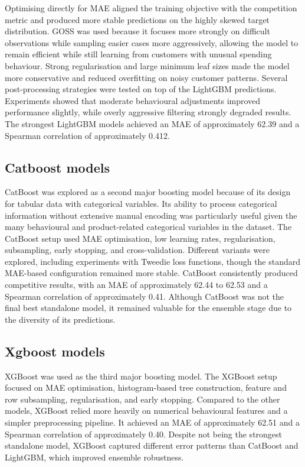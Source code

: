 Optimising directly for MAE aligned the training objective with the competition metric and produced more stable predictions on the highly skewed target distribution. GOSS was used because it focuses more strongly on difficult observations while sampling easier cases more aggressively, allowing the model to remain efficient while still learning from customers with unusual spending behaviour. Strong regularisation and large minimum leaf sizes made the model more conservative and reduced overfitting on noisy customer patterns. Several post-processing strategies were tested on top of the LightGBM predictions. Experiments showed that moderate behavioural adjustments improved performance slightly, while overly aggressive filtering strongly degraded results. The strongest LightGBM models achieved an MAE of approximately 62.39 and a Spearman correlation of approximately 0.412.

\subsection{Catboost models}
CatBoost was explored as a second major boosting model because of its design for tabular data with categorical variables. Its ability to process categorical information without extensive manual encoding was particularly useful given the many behavioural and product-related categorical variables in the dataset. The CatBoost setup used MAE optimisation, low learning rates, regularisation, subsampling, early stopping, and cross-validation. Different variants were explored, including experiments with Tweedie loss functions, though the standard MAE-based configuration remained more stable. CatBoost consistently produced competitive results, with an MAE of approximately 62.44 to 62.53 and a Spearman correlation of approximately 0.41. Although CatBoost was not the final best standalone model, it remained valuable for the ensemble stage due to the diversity of its predictions.

\subsection{Xgboost models}
XGBoost was used as the third major boosting model. The XGBoost setup focused on MAE optimisation, histogram-based tree construction, feature and row subsampling, regularisation, and early stopping. Compared to the other models, XGBoost relied more heavily on numerical behavioural features and a simpler preprocessing pipeline. It achieved an MAE of approximately 62.51 and a Spearman correlation of approximately 0.40. Despite not being the strongest standalone model, XGBoost captured different error patterns than CatBoost and LightGBM, which improved ensemble robustness.

